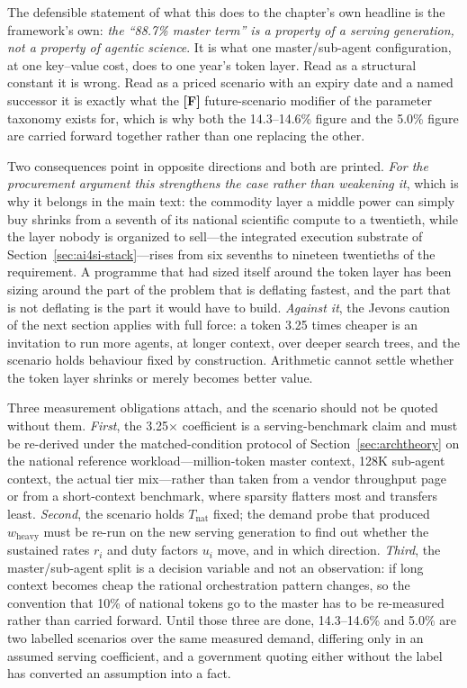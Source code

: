 The defensible statement of what this does to the chapter's own headline is the framework's own: \emph{the ``88.7\% master term'' is a property of a serving generation, not a property of agentic science}. It is what one master/sub-agent configuration, at one key--value cost, does to one year's token layer. Read as a structural constant it is wrong. Read as a priced scenario with an expiry date and a named successor it is exactly what the \textbf{[F]} future-scenario modifier of the parameter taxonomy exists for, which is why both the 14.3--14.6\% figure and the 5.0\% figure are carried forward together rather than one replacing the other.

Two consequences point in opposite directions and both are printed. \emph{For the procurement argument this strengthens the case rather than weakening it}, which is why it belongs in the main text: the commodity layer a middle power can simply buy shrinks from a seventh of its national scientific compute to a twentieth, while the layer nobody is organized to sell---the integrated execution substrate of Section~\ref{sec:ai4si-stack}---rises from six sevenths to nineteen twentieths of the requirement. A programme that had sized itself around the token layer has been sizing around the part of the problem that is deflating fastest, and the part that is not deflating is the part it would have to build. \emph{Against it}, the Jevons caution of the next section applies with full force: a token 3.25 times cheaper is an invitation to run more agents, at longer context, over deeper search trees, and the scenario holds behaviour fixed by construction. Arithmetic cannot settle whether the token layer shrinks or merely becomes better value.

Three measurement obligations attach, and the scenario should not be quoted without them. \emph{First}, the 3.25$\times$ coefficient is a serving-benchmark claim and must be re-derived under the matched-condition protocol of Section~\ref{sec:archtheory} on the national reference workload---million-token master context, 128K sub-agent context, the actual tier mix---rather than taken from a vendor throughput page or from a short-context benchmark, where sparsity flatters most and transfers least. \emph{Second}, the scenario holds $T_{\mathrm{nat}}$ fixed; the demand probe that produced $w_{\mathrm{heavy}}$ must be re-run on the new serving generation to find out whether the sustained rates $r_i$ and duty factors $u_i$ move, and in which direction. \emph{Third}, the master/sub-agent split is a decision variable and not an observation: if long context becomes cheap the rational orchestration pattern changes, so the convention that 10\% of national tokens go to the master has to be re-measured rather than carried forward. Until those three are done, 14.3--14.6\% and 5.0\% are two labelled scenarios over the same measured demand, differing only in an assumed serving coefficient, and a government quoting either without the label has converted an assumption into a fact.

